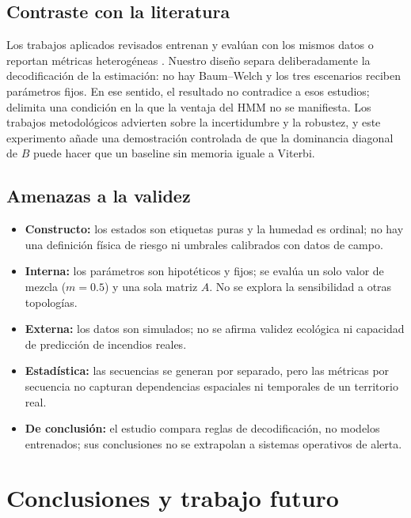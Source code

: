 \documentclass[11pt,letterpaper]{article}
\begin{document}
\subsection{Contraste con la literatura}

Los trabajos aplicados revisados entrenan y evalúan con los mismos datos o reportan métricas heterogéneas \cite{wanjala2025,grammenos2025,tran2026,li2013,wang2026}. Nuestro diseño separa deliberadamente la decodificación de la estimación: no hay Baum--Welch y los tres escenarios reciben parámetros fijos. En ese sentido, el resultado no contradice a esos estudios; delimita una condición en la que la ventaja del HMM no se manifiesta. Los trabajos metodológicos \cite{nicosia2026,pouzo2025} advierten sobre la incertidumbre y la robustez, y este experimento añade una demostración controlada de que la dominancia diagonal de \(B\) puede hacer que un baseline sin memoria iguale a Viterbi.

\subsection{Amenazas a la validez}

\begin{itemize}
  \item \textbf{Constructo:} los estados son etiquetas puras y la humedad es ordinal; no hay una definición física de riesgo ni umbrales calibrados con datos de campo.
  \item \textbf{Interna:} los parámetros son hipotéticos y fijos; se evalúa un solo valor de mezcla (\(m=0.5\)) y una sola matriz \(A\). No se explora la sensibilidad a otras topologías.
  \item \textbf{Externa:} los datos son simulados; no se afirma validez ecológica ni capacidad de predicción de incendios reales.
  \item \textbf{Estadística:} las secuencias se generan por separado, pero las métricas por secuencia no capturan dependencias espaciales ni temporales de un territorio real.
  \item \textbf{De conclusión:} el estudio compara reglas de decodificación, no modelos entrenados; sus conclusiones no se extrapolan a sistemas operativos de alerta.
\end{itemize}

\section{Conclusiones y trabajo futuro}
\end{document}
